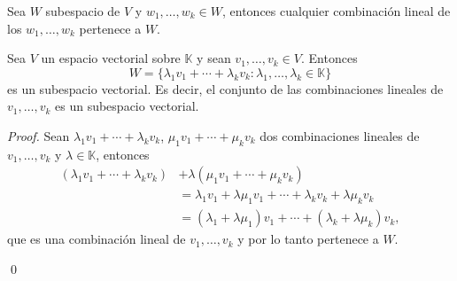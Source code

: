 \documentclass[handout]{beamer} %
\newcommand{\K}{\mathbb K}
\begin{document}
\begin{frame}
    \begin{proposicion}
        Sea $W$ subespacio de $V$ y $w_1,\ldots,w_k \in W$,  entonces cualquier combinación lineal de los $w_1,\ldots,w_k$ pertenece a $W$.
    \end{proposicion}  \pause

            
\end{frame}

                            
    

\begin{frame}

\begin{teorema}
    Sea $V$ un espacio vectorial sobre $\K$ y sean $v_1,\ldots,v_k \in V$. Entonces
    $$
    W = \{\lambda_1v_1+\cdots+\lambda_kv_k: \lambda_1,\ldots,\lambda_k \in \K \}
    $$
    es un subespacio vectorial. Es decir,  el conjunto de las combinaciones lineales de $v_1,\ldots,v_k$ es un subespacio vectorial.
    \end{teorema}  \pause
    \begin{proof}  \pause
                Sean $\lambda_1v_1+\cdots+\lambda_kv_k$, $\mu_1v_1+\cdots+\mu_kv_k$ dos combinaciones lineales de $v_1,\ldots,v_k$ y $\lambda \in \K$, entonces 
            \begin{align*}
                (\lambda_1v_1+\cdots+\lambda_kv_k)&+\lambda (\mu_1v_1+\cdots+\mu_kv_k) \\&=  \lambda_1v_1+\lambda\mu_1v_1+\cdots+\lambda_kv_k+\lambda\mu_kv_k\\
                &= (\lambda_1+\lambda\mu_1)v_1+\cdots+(\lambda_k+\lambda\mu_k)v_k,
            \end{align*}
            que es  una combinación lineal de  $v_1,\ldots,v_k$ y por lo tanto pertenece a $W$. 
            
            \qed
    \end{proof}
    
\end{frame}
\end{document}
